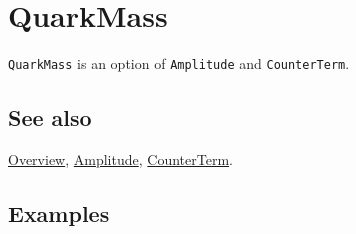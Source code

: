 \documentclass[../FeynCalcManual.tex]{subfiles}
\begin{document}
\hypertarget{quarkmass}{
\section{QuarkMass}\label{quarkmass}}

\texttt{QuarkMass} is an option of \texttt{Amplitude} and
\texttt{CounterTerm}.

\subsection{See also}

\hyperlink{toc}{Overview}, \hyperlink{amplitude}{Amplitude},
\hyperlink{counterterm}{CounterTerm}.

\subsection{Examples}
\end{document}
